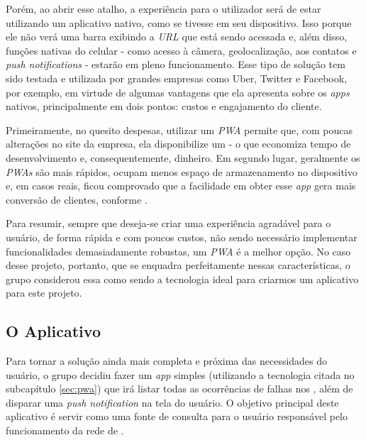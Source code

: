 Porém, ao abrir esse atalho, a experiência para o utilizador será de estar utilizando um aplicativo nativo, como se tivesse  em seu dispositivo. Isso porque ele não verá uma barra exibindo a \textit{URL} que está sendo acessada e, além disso, funções nativas do celular - como acesso à câmera, geolocalização, aos contatos e \textit{push notifications} - estarão em pleno funcionamento. Esse tipo de solução tem sido testada e utilizada por grandes empresas como Uber, Twitter e Facebook, por exemplo, em virtude de algumas vantagens que ela apresenta sobre os \textit{apps} nativos, principalmente em dois pontos: custos e engajamento do cliente.


Primeiramente, no quesito despesas, utilizar um \textit{PWA} permite que, com poucas alterações no site da empresa, ela disponibilize um  - o que economiza tempo de desenvolvimento e, consequentemente, dinheiro. Em segundo lugar, geralmente os \textit{PWAs} são mais rápidos, ocupam menos espaço de armazenamento no dispositivo e, em casos reais, ficou comprovado que a facilidade em obter esse \textit{app} gera mais conversão de clientes, conforme \cite{Souza19} .

Para resumir, sempre que deseja-se criar uma experiência agradável para o usuário, de forma rápida e com poucos custos, não sendo necessário implementar funcionalidades demasiadamente robustas, um \textit{PWA} é a melhor opção. No caso desse projeto, portanto, que se enquadra perfeitamente nessas características, o grupo considerou essa como sendo a tecnologia ideal para criarmos um aplicativo para este projeto.


\subsection{O Aplicativo}
\label{subsec:o_aplicativo}

Para tornar a solução ainda mais completa e próxima das necessidades do usuário, o grupo decidiu fazer um \textit{app} simples (utilizando a tecnologia citada no subcapítulo \ref{sec:pwa}) que irá listar todas as ocorrências de falhas nos \containers{}, além de disparar uma \textit{push notification} na tela do usuário. O objetivo principal deste aplicativo é servir como uma fonte de consulta para o usuário responsável pelo funcionamento da rede de \containers{}.

